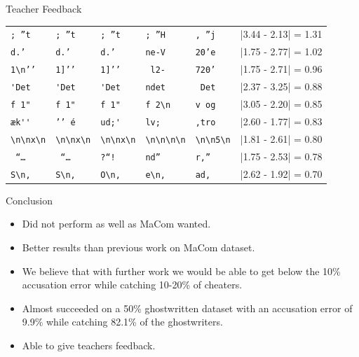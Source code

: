 \documentclass[10pt]{beamer}
\begin{document}
\begin{frame}[fragile]{Teacher Feedback}
\begin{center}
\begin{tabular}{lll|lll}
            \verb[; ”t[       & \verb[; ”t[       & \verb[; ”t[          &
            \verb'; ”H'       & \verb', ”j'       & |3.44 - 2.13| = 1.31 \\

            \verb[d.’ [       & \verb[d.’ [       & \verb[d.’ [          &
            \verb'ne-V'       & \verb'20’e'       & |1.75 - 2.77| = 1.02 \\

            \verb[1\n’’[      & \verb[1]’’[       & \verb[1]’’[          &
            \verb' l2-'       & \verb'720’'       & |1.75 - 2.71| = 0.96 \\

            \verb['Det[       & \verb['Det[       & \verb['Det[          &
            \verb'ndet'       & \verb' Det'       & |2.37 - 3.25| = 0.88 \\

            \verb[f 1"[       & \verb[f 1"[       & \verb[f 1"[          &
            \verb'f 2\n'      & \verb'v og'       & |3.05 - 2.20| = 0.85 \\

            \verb[æk''[       & \verb[’’ é[       & \verb[ud;'[          &
            \verb'lv; '       & \verb',tro'       & |2.60 - 1.77| = 0.83 \\

            \verb[\n\nx\n[    & \verb[\n\nx\n[    & \verb[\n\nx\n[       &
            \verb'\n\n\n\n'   & \verb'\n\n5\n'    & |1.81 - 2.61| = 0.80 \\
            \verb[ “… [       & \verb[ “… [       & \verb[?“! [          &
            \verb'nd” '       & \verb'r,” '       & |1.75 - 2.53| = 0.78 \\

            \verb[S\n, [      & \verb[S\n, [      & \verb[O\n, [         &
            \verb'e\n, '      & \verb'ad, '       & |2.62 - 1.92| = 0.70 \\
        \end{tabular}
    \end{center}
\end{frame}

\begin{frame}[fragile]{Conclusion}
    \begin{itemize}
        \item Did not perform as well as MaCom wanted.
        \item Better results than previous work on MaCom dataset.
        \item We believe that with further work we would be able to get below
            the 10\% accusation error while catching 10-20\% of cheaters.
        \item Almost succeeded on a 50\% ghostwritten dataset with an accusation
            error of 9.9\% while catching 82.1\% of the ghostwriters.
        \item Able to give teachers feedback.
    \end{itemize}
\end{frame}
\end{document}
